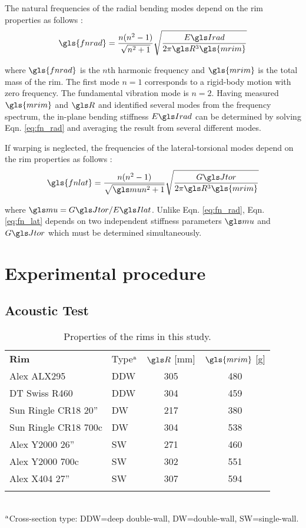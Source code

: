 \documentclass[../thesis.tex]{subfiles}
\begin{document}
The natural frequencies of the radial bending modes depend on the rim properties as follows \cite{Timoshenko1955}:
  \begin{equation}\label{eq:fn_rad}
  \gls{fnrad} = \frac{n(n^2-1)}{\sqrt{n^2+1}} \sqrt{\frac{\EIr}{2\pi \R^3 \gls{mrim}}}
  \end{equation}

where $\gls{fnrad}$ is the $n$th harmonic frequency and $\gls{mrim}$ is the total mass of the rim. The first mode $n=1$ corresponds to a rigid-body motion with zero frequency. The fundamental vibration mode is $n=2$. Having measured $\gls{mrim}$ and $\R$ and identified several modes from the frequency spectrum, the in-plane bending stiffness $\EIr$ can be determined by solving Eqn. \eqref{eq:fn_rad} and averaging the result from several different modes.

If warping is neglected, the frequencies of the lateral-torsional modes depend on the rim properties as follows \cite{Timoshenko1955}:
  \begin{equation}\label{eq:fn_lat}
  \gls{fnlat} = \frac{n(n^2-1)}{\sqrt{\m n^2+1}} \sqrt{\frac{\GJ}{2\pi \R^3 \gls{mrim}}}
  \end{equation}

where $\m=\GJ/\EIl$. Unlike Eqn. \eqref{eq:fn_rad}, Eqn. \eqref{eq:fn_lat} depends on two independent stiffness parameters $\m$ and $\GJ$ which must be determined simultaneously.


\section{Experimental procedure}

\subsection{Acoustic Test}

  \begin{table}
  \caption{Properties of the rims in this study.\label{tb:rims}}
  \begin{tabular}{@{}llcc}
  \hline\noalign{\smallskip}
  \bf{Rim} & Type$^{\rm a}$ & $\R$ [mm] & $\gls{mrim}$ [g]\\
  \noalign{\smallskip}\hline\noalign{\smallskip}
  Alex ALX295          & DDW & 305 & 480\\
  DT Swiss R460        & DDW & 304 & 459\\
  Sun Ringle CR18 20'' & DW  & 217 & 380\\
  Sun Ringle CR18 700c & DW  & 304 & 538\\
  Alex Y2000 26''      & SW  & 271 & 460\\
  Alex Y2000 700c      & SW  & 302 & 551\\
  Alex X404 27''       & SW  & 307 & 594\\
  \noalign{\smallskip}\hline
  \end{tabular}\\
  $^{\rm a}$Cross-section type: DDW=deep double-wall, DW=double-wall, SW=single-wall.
  \end{table}
\end{document}
